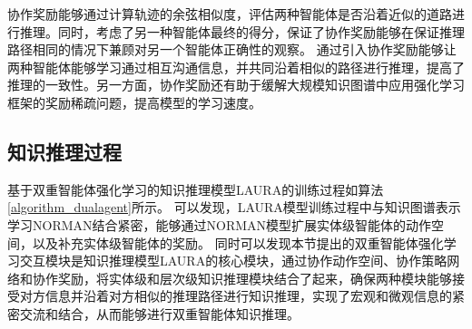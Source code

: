 \documentclass[algorithmlist, AutoFakeBold, AutoFakeSlant, figurelist, tablelist, nomlist, engineering]{seuthesix}
\begin{document}
协作奖励能够通过计算轨迹的余弦相似度，评估两种智能体是否沿着近似的道路进行推理。同时，考虑了另一种智能体最终的得分，保证了协作奖励能够在保证推理路径相同的情况下兼顾对另一个智能体正确性的观察。
通过引入协作奖励能够让两种智能体能够学习通过相互沟通信息，并共同沿着相似的路径进行推理，提高了推理的一致性。另一方面，协作奖励还有助于缓解大规模知识图谱中应用强化学习框架的奖励稀疏问题，提高模型的学习速度。

\subsection{知识推理过程}
基于双重智能体强化学习的知识推理模型LAURA的训练过程如算法\ref{algorithm_dualagent}所示。
可以发现，LAURA模型训练过程中与知识图谱表示学习NORMAN结合紧密，能够通过NORMAN模型扩展实体级智能体的动作空间，以及补充实体级智能体的奖励。
同时可以发现本节提出的双重智能体强化学习交互模块是知识推理模型LAURA的核心模块，通过协作动作空间、协作策略网络和协作奖励，将实体级和层次级知识推理模块结合了起来，确保两种模块能够接受对方信息并沿着对方相似的推理路径进行知识推理，实现了宏观和微观信息的紧密交流和结合，从而能够进行双重智能体知识推理。
\end{document}
